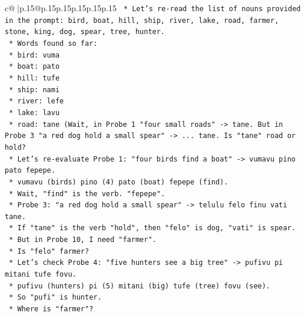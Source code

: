 \documentclass{article}
\begin{document}
{\begin{supertabular}{c@{$\;$}|p{.15\linewidth}@{}p{.15\linewidth}p{.15\linewidth}p{.15\linewidth}p{.15\linewidth}p{.15\linewidth}}
{{{\texttt{                        *   Let's re{-}read the list of nouns provided in the prompt: bird, boat, hill, ship, river, lake, road, farmer, stone, king, dog, spear, tree, hunter.} \\
\texttt{                        *   Words found so far:} \\
\texttt{                            *   bird: vuma} \\
\texttt{                            *   boat: pato} \\
\texttt{                            *   hill: tufe} \\
\texttt{                            *   ship: nami} \\
\texttt{                            *   river: lefe} \\
\texttt{                            *   lake: lavu} \\
\texttt{                            *   road: tane (Wait, in Probe 1 "four small roads" {-}> tane. But in Probe 3 "a red dog hold a small spear" {-}> ... tane. Is "tane" road or hold?} \\
\texttt{                            *   Let's re{-}evaluate Probe 1: "four birds find a boat" {-}> vumavu pino pato fepepe.} \\
\texttt{                                *   vumavu (birds) pino (4) pato (boat) fepepe (find).} \\
\texttt{                                *   Wait, "find" is the verb. "fepepe".} \\
\texttt{                            *   Probe 3: "a red dog hold a small spear" {-}> telulu felo finu vati tane.} \\
\texttt{                                *   If "tane" is the verb "hold", then "felo" is dog, "vati" is spear.} \\
\texttt{                                *   But in Probe 10, I need "farmer".} \\
\texttt{                                *   Is "felo" farmer?} \\
\texttt{                                *   Let's check Probe 4: "five hunters see a big tree" {-}> pufivu pi mitani tufe fovu.} \\
\texttt{                                    *   pufivu (hunters) pi (5) mitani (big) tufe (tree) fovu (see).} \\
\texttt{                                    *   So "pufi" is hunter.} \\
\texttt{                                *   Where is "farmer"?} \\
}}}
\end{supertabular}}
\end{document}
